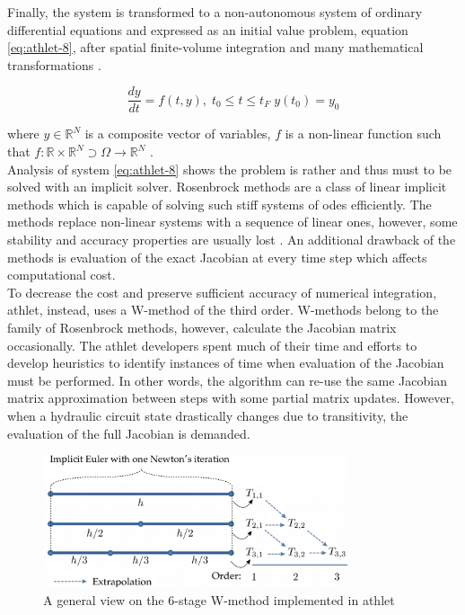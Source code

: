 Finally, the system is transformed to a non-autonomous system of ordinary differential equations and expressed as an initial value problem, equation \ref{eq:athlet-8}, after spatial finite-volume integration and many mathematical transformations \cite{lt:ATHLMaM}. 


\begin{equation} \label{eq:athlet-8}
	\frac{dy}{dt} = f(t,y), \;  t_{0} \leq t \leq t_{F} \; y(t_{0}) = y_{0}
\end{equation}

where $y \in \mathbb{R}^{N}$ is a composite vector of variables, $f$ is a non-linear function such that $f : \mathbb{R} \times \mathbb{R}^{N} \supset \Omega  \rightarrow \mathbb{R}^{N}$  .\\


Analysis of system \ref{eq:athlet-8} shows the problem is rather and thus must to be solved with an implicit solver. Rosenbrock methods are a class of linear implicit methods which is capable of solving such stiff systems of \acrshort{ode}s efficiently. The methods replace non-linear systems with a sequence of linear ones, however, some stability and accuracy properties are usually lost \cite{blom2013rosenbrock}. An additional drawback of the methods is evaluation of the exact Jacobian at every time step which affects computational cost.\\


To decrease the cost and preserve sufficient accuracy of numerical integration, \acrshort{athlet}, instead, uses a W-method of the third order. W-methods belong to the family of Rosenbrock methods, however, calculate the Jacobian matrix occasionally. The \acrshort{athlet} developers spent much of their time and efforts to develop heuristics to identify instances of time when evaluation of the Jacobian must be performed. In other words, the algorithm can re-use the same Jacobian matrix approximation between steps with some partial matrix updates. However, when a hydraulic circuit state drastically changes due to transitivity, the evaluation of the full Jacobian is demanded.\\


\figpointer{\ref{fig:introduction-w-method-scheme}}
\begin{figure}[htpb]
  \centering
  \includegraphics[width=0.8\textwidth]{figures/introduction-rosenbrock-scheme.png}
\caption{A general view on the 6-stage W-method implemented in \acrshort{athlet}}
\label{fig:introduction-w-method-scheme}
\end{figure}


